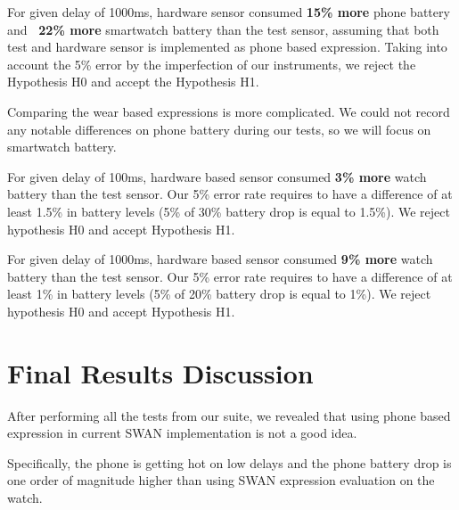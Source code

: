 For given delay of 1000ms, hardware sensor consumed \textbf{15\% more} phone battery and \textbf{~22\% more } smartwatch battery than the test sensor, assuming that both test and hardware
sensor is implemented as phone based expression.
Taking into account the 5\% error by the imperfection of our instruments, we reject the Hypothesis H0 and accept the Hypothesis H1.

Comparing the wear based expressions is more complicated. We could not record any notable differences on phone battery during our tests, so we will focus on smartwatch battery.

For given delay of 100ms,  hardware based sensor consumed \textbf{3\% more} watch battery than the test sensor.
Our 5\% error rate requires to have a difference of at least 1.5\% in battery levels (5\% of 30\% battery drop is equal to 1.5\%). We
reject hypothesis H0 and accept Hypothesis H1.

For given delay of 1000ms,  hardware based sensor consumed \textbf{9\% more} watch battery than the test sensor.
Our 5\% error rate requires to have a difference of at least 1\% in battery levels (5\% of 20\% battery drop is equal to 1\%). We
reject hypothesis H0 and accept Hypothesis H1.

\section{Final Results Discussion}

After performing all the tests from our suite, we revealed that using phone based expression in current SWAN implementation is not a good idea.

Specifically, the phone is getting hot on low delays and the phone battery drop is one order of magnitude higher than using SWAN expression evaluation on the watch.

